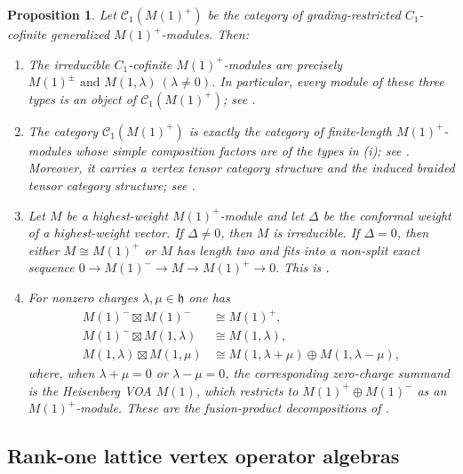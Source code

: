 \documentclass[12pt,leqno]{amsart}
\numberwithin{equation}{section} \newtheorem{thm}{Theorem}[section] \newtheorem{lem}[thm]{Lemma} \newtheorem{ex}[thm]{Example} \newtheorem{prop}[thm]{Proposition} \newtheorem{cor}[thm]{Corollary} \newtheorem{defi}[thm]{Definition} \newtheorem{rmk}[thm]{Remark} \newtheorem{notation}[thm]{Notation}
\begin{document}
\begin{prop}\label{prop:ALY-package}
Let $\mathcal C_1(M(1)^+)$ be the category of grading-restricted $C_1$-cofinite generalized $M(1)^+$-modules. Then:
\begin{enumerate}[label=\textnormal{(\roman*)}]
\item The irreducible $C_1$-cofinite $M(1)^+$-modules are precisely
\(M(1)^\pm\text{ and }M(1,\lambda)\ (\lambda\ne0)\). In particular, every module of these three types is an object of $\mathcal C_1(M(1)^+)$; see \cite[Corollary~3.4 and Theorems~3.5--3.6]{ALY}.

\item The category $\mathcal C_1(M(1)^+)$ is exactly the category of
finite-length $M(1)^+$-modules whose simple composition factors are of the types in \textnormal{(i)}; see \cite[Theorem~4.2]{ALY}. Moreover, it carries a vertex tensor category structure and the induced braided tensor category structure; see \cite[Theorem~4.3]{ALY}.

\item Let $M$ be a highest-weight $M(1)^+$-module and let $\Delta$ be
the conformal weight of a highest-weight vector. If $\Delta\ne0$, then $M$ is irreducible. If $\Delta=0$, then either $M\cong M(1)^+$ or $M$ has length two and fits into a non-split exact sequence \(0\longrightarrow M(1)^-\longrightarrow M\longrightarrow M(1)^+\longrightarrow0.\) This is \cite[Theorem~3.8]{ALY}.

\item For nonzero charges $\lambda,\mu\in\mathfrak h$ one has
\begin{align*}
M(1)^-\boxtimes M(1)^-&\cong M(1)^+,\\
M(1)^-\boxtimes M(1,\lambda)&\cong M(1,\lambda),\\
M(1,\lambda)\boxtimes M(1,\mu)
&\cong M(1,\lambda+\mu)\oplus M(1,\lambda-\mu),
\end{align*}
where, when $\lambda+\mu=0$ or $\lambda-\mu=0$, the corresponding zero-charge summand is the Heisenberg VOA $M(1)$, which restricts to $M(1)^+\oplus M(1)^-$ as an $M(1)^+$-module. These are the fusion-product decompositions of \cite[Theorem~4.6]{ALY}.
\end{enumerate}
\end{prop}

\subsection{Rank-one lattice vertex operator algebras}
\label{subsec:rank-one-lattice}
\end{document}
